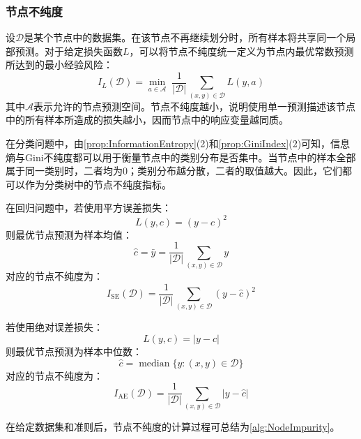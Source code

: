 \subsubsection{节点不纯度}
设$\mathcal{D}$是某个节点中的数据集。在该节点不再继续划分时，所有样本将共享同一个局部预测。对于给定损失函数$L$，可以将节点不纯度统一定义为节点内最优常数预测所达到的最小经验风险：
\begin{equation*}
	I_{L}(\mathcal{D})=\underset{a\in\mathcal{A}}{\min}\;\frac{1}{|\mathcal{D}|}\sum_{(x,y)\in\mathcal{D}}L(y,a)
\end{equation*}
其中$\mathcal{A}$表示允许的节点预测空间。节点不纯度越小，说明使用单一预测描述该节点中的所有样本所造成的损失越小，因而节点中的响应变量越同质。\par
在分类问题中，由\cref{prop:InformationEntropy}(2)和\cref{prop:GiniIndex}(2)可知，信息熵与Gini不纯度都可以用于衡量节点中的类别分布是否集中。当节点中的样本全部属于同一类别时，二者均为$0$；类别分布越分散，二者的取值越大。因此，它们都可以作为分类树中的节点不纯度指标。\par
在回归问题中，若使用平方误差损失：
\begin{equation*}
	L(y,c)=(y-c)^2
\end{equation*}
则最优节点预测为样本均值：
\begin{equation*}
	\hat{c}=\bar{y}=\frac{1}{|\mathcal{D}|}\sum_{(x,y)\in\mathcal{D}}y
\end{equation*}
对应的节点不纯度为：
\begin{equation*}
	I_{\mathrm{SE}}(\mathcal{D})=\frac{1}{|\mathcal{D}|}\sum_{(x,y)\in\mathcal{D}}(y-\hat{c})^2
\end{equation*}\par
若使用绝对误差损失：
\begin{equation*}
	L(y,c)=|y-c|
\end{equation*}
则最优节点预测为样本中位数：
\begin{equation*}
	\hat{c}=\operatorname{median}\{y:(x,y)\in\mathcal{D}\}
\end{equation*}
对应的节点不纯度为：
\begin{equation*}
	I_{\mathrm{AE}}(\mathcal{D})=\frac{1}{|\mathcal{D}|}\sum_{(x,y)\in\mathcal{D}}|y-\hat{c}|
\end{equation*}\par
在给定数据集和准则后，节点不纯度的计算过程可总结为\cref{alg:NodeImpurity}。
